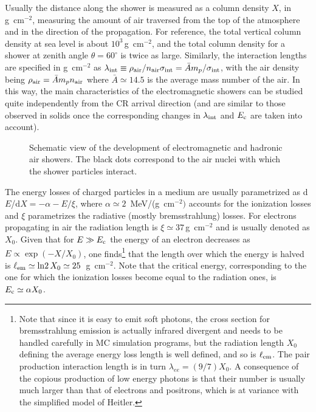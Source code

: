 \documentclass[twoside,12pt]{article}
\begin{document}
Usually the distance along the shower is measured as a column density $X$, in g~cm$^{-2}$, measuring the amount of air traversed from the top of the atmosphere and in the direction of the propagation. For reference, the total vertical column density at sea level is about $10^3$\,g~cm$^{-2}$, and the total column density for a shower at zenith angle $\theta=60^\circ$ is twice as large. Similarly, the interaction lengths are specified in g~cm$^{-2}$ as $\lambda_{\rm int}\equiv \rho_{\rm air}/n_{\rm air}\sigma_{\rm int}={\bar A} m_p/\sigma_{\rm int}$, with the air density being $\rho_{\rm air}={\bar A} m_p n_{\rm air}$ where ${\bar A}\simeq 14.5$ is the average mass number of the air. In this way, the main characteristics of the electromagnetic showers can be studied quite independently from the CR arrival direction (and are similar to those observed in solids once the corresponding changes in $\lambda_{\rm int}$ and $E_{\rm c}$ are taken into account). 

\begin{figure}
\begin{center}
\begin{minipage}[t]{8 cm}
\centerline{}
\end{minipage}
\begin{minipage}[t]{16.5 cm}
\caption{Schematic view of the development of electromagnetic and hadronic air showers. The black dots correspond to the air nuclei with which the shower particles interact.\label{airsh.fig}}
\end{minipage}
\end{center}
\end{figure}


The energy losses of charged particles in a medium are usually parametrized as d$E$/d$X=-\alpha-E/\xi$, where $\alpha\simeq 2$~MeV/(g~cm$^{-2})$ accounts for the ionization losses and $\xi$ parametrizes the radiative (mostly bremsstrahlung) losses. For electrons propagating in air  the radiation length is  $\xi\simeq 37$\,g~cm$^{-2}$ and is usually denoted as $X_0$.  Given that for $E\gg E_{\rm c}$  the energy of an electron decreases as $E\propto \exp(-X/X_0)$, one finds\footnote{Note that since it is easy to emit soft photons, the cross section for bremsstrahlung emission is actually infrared divergent and needs to be handled carefully in MC simulation programs,  but the radiation length $X_0$ defining the average energy loss length is well defined, and so is $\ell_{\rm em}$. The pair production interaction length is in turn $\lambda_{ee}=(9/7)X_0$. A consequence of the copious production of low energy photons is that their number is usually much larger than that of electrons and positrons, which is at variance with the simplified model of Heitler.} that the length over which the energy is halved is $\ell_{\rm em}\simeq {\rm ln}2\,X_0\simeq 25$~g~cm$^{-2}$. Note that the critical energy, corresponding to the one for which the ionization losses become equal to the radiation ones, is $E_{\rm c}\simeq\alpha X_0$.
\end{document}
